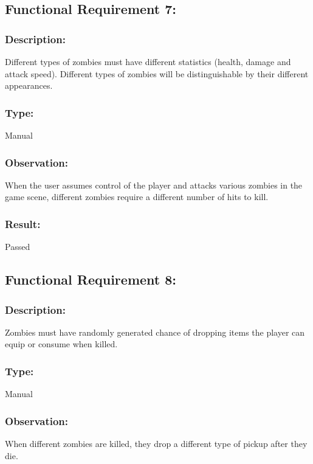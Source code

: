 \documentclass[12pt, titlepage]{article}
\begin{document}

\subsection{Functional Requirement 7: } 

\subsubsection{Description: }Different types of zombies must have different statistics (health, damage and attack speed). Different types of zombies will be distinguishable by their different appearances. 

\subsubsection{Type: } Manual

\subsubsection{Observation: } When the user assumes control of the player and attacks various zombies in the game scene, different zombies require a different number of hits to kill.

\subsubsection[Pass / Fail:] {Result: } Passed


\subsection{Functional Requirement 8: } 

\subsubsection{Description: }Zombies must have randomly generated chance of dropping items the player can equip or consume when killed.

\subsubsection{Type: } Manual

\subsubsection{Observation: } When different zombies are killed, they drop a different type of pickup after they die. 
\end{document}
